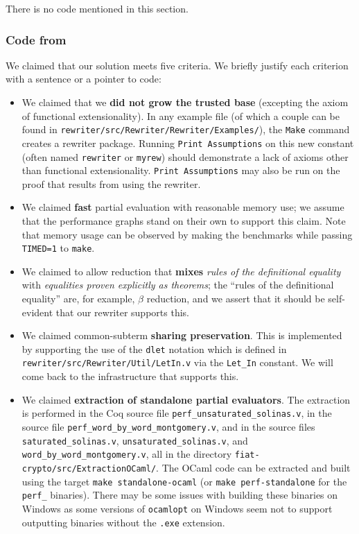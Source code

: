 \begin{subappendices}
There is no code mentioned in this section.

\subsubsection{Code from }

We claimed that our solution meets five criteria.
We briefly justify each criterion with a sentence or a pointer to code:
\begin{itemize}
  \item
    We claimed that we \textbf{did not grow the trusted base} (excepting the axiom of functional extensionality).
    In any example file (of which a couple can be found in \texttt{rewriter/src/Rewriter/Rewriter/Examples/}), the \texttt{Make} command creates a rewriter package.
    Running \texttt{Print Assumptions} on this new constant (often named \texttt{rewriter} or \texttt{myrew}) should demonstrate a lack of axioms other than functional extensionality.
    \texttt{Print Assumptions} may also be run on the proof that results from using the rewriter.
  \item
    We claimed \textbf{fast} partial evaluation with reasonable memory use; we assume that the performance graphs stand on their own to support this claim.
    Note that memory usage can be observed by making the benchmarks while passing \texttt{TIMED=1} to \texttt{make}.
  \item
    We claimed to allow reduction that \textbf{mixes} \emph{rules of the definitional equality} with \emph{equalities proven explicitly as theorems}; the ``rules of the definitional equality'' are, for example, $\beta$ reduction, and we assert that it should be self-evident that our rewriter supports this.
  \item
    We claimed common-subterm \textbf{sharing preservation}.
    This is implemented by supporting the use of the \texttt{dlet} notation which is defined in \texttt{rewriter/src/Rewriter/Util/LetIn.v} via the \texttt{Let\_In} constant.
    We will come back to the infrastructure that supports this.
  \item
    We claimed \textbf{extraction of standalone partial evaluators}.
    The extraction is performed in the Coq source file \texttt{perf\_unsaturated\_solinas.v}, in the source file \texttt{perf\_word\_by\_word\_montgomery.v}, and in the source files \texttt{saturated\_solinas.v}, \texttt{unsaturated\_solinas.v}, and \texttt{word\_by\_word\_montgomery.v}, all in the directory \texttt{fiat-crypto/src/ExtractionOCaml/}.
    The OCaml code can be extracted and built using the target \texttt{make standalone-ocaml} (or \texttt{make perf-standalone} for the \texttt{perf\_} binaries).
    There may be some issues with building these binaries on Windows as some versions of \texttt{ocamlopt} on Windows seem not to support outputting binaries without the \texttt{.exe} extension.
\end{itemize}


\end{subappendices}
